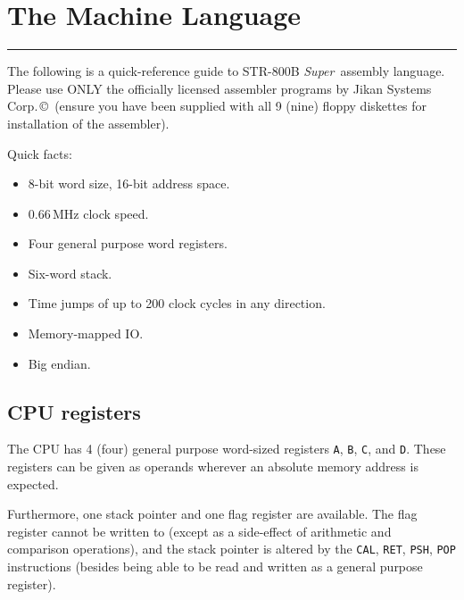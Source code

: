 \documentclass[a5paper,onecolumn,final,10pt]{memoir}
\newcommand\machinename%
	{\textsf{STR-800B \textit{Super}}}
\newcommand\companyname%
	{Jikan Systems Corp.\,\copyright}
\begin{document}
\noindent



\clearpage
\section{The Machine Language}
\vspace*{-20pt}\rule{\textwidth}{0.8pt}

\noindent
The following is a quick-reference guide to \machinename\ assembly language. Please use ONLY the officially licensed assembler programs by \companyname\ (ensure you have been supplied with all 9 (nine) floppy diskettes for installation of the assembler). 


Quick facts:
\begin{itemize}[nosep]
	\item 8-bit word size, 16-bit address space. 
	\item 0.66\,MHz clock speed. 
	\item Four general purpose word registers.
	\item Six-word stack. 
	\item Time jumps of up to 200 clock cycles in any direction.\footnotemark
	\item Memory-mapped IO. 
	\item Big endian. 
\end{itemize}

\subsection*{CPU registers}

The CPU has 4 (four) general purpose word-sized registers \texttt{A}, \texttt{B}, \texttt{C}, and \texttt{D}. 
These registers can be given as operands wherever an absolute memory address is expected. 

Furthermore, one stack pointer and one flag register are available. 
The flag register cannot be written to (except as a side-effect of arithmetic and comparison operations), 
and the stack pointer is altered by the \texttt{CAL}, \texttt{RET}, \texttt{PSH}, \texttt{POP} instructions 
(besides being able to be read and written as a general purpose register). 
\end{document}
